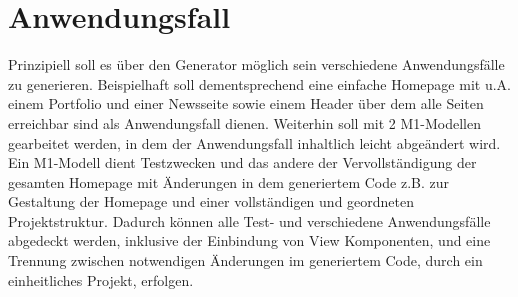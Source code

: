 \section{Anwendungsfall}
\label{Anwendungsfall}
Prinzipiell soll es über den Generator möglich sein verschiedene Anwendungsfälle
zu generieren. Beispielhaft soll dementsprechend eine
einfache Homepage mit u.A.
einem Portfolio und einer Newsseite sowie einem Header über dem alle Seiten
erreichbar sind als Anwendungsfall dienen. Weiterhin soll mit 2
M1-Modellen gearbeitet werden, in dem der Anwendungsfall inhaltlich leicht abgeändert wird.
Ein M1-Modell dient Testzwecken und das andere der Vervollständigung der
gesamten Homepage mit Änderungen in dem generiertem Code z.B. zur Gestaltung der
Homepage und einer vollständigen und geordneten Projektstruktur.
Dadurch können alle Test- und verschiedene Anwendungsfälle abgedeckt werden,
inklusive der Einbindung von View Komponenten, und eine Trennung zwischen notwendigen Änderungen im
generiertem Code, durch ein einheitliches Projekt, erfolgen.
